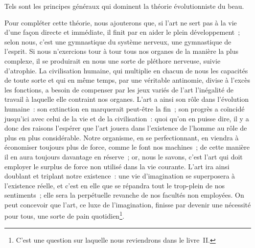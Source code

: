 \documentclass[french,twoside]{book} %
\begin{document}
Tels sont les principes généraux qui dominent la théorie évolutionniste du beau.\par
Pour compléter cette théorie, nous ajouterons que, si l’art ne sert pas à la vie d’une façon directe et immédiate, il finit par en aider le plein développement ; selon nous, c’est une gymnastique du système nerveux, une gymnastique de l’esprit. Si nous n’exercions tour à tour tous nos organes de la manière la plus complexe, il se produirait en nous une sorte de pléthore nerveuse, suivie d’atrophie. La civilisation humaine, qui multiplie en chacun de nous les capacités de toute sorte et qui en même temps, par une véritable antinomie, divise à l’excès les fonctions, a besoin de compenser par les jeux variés de  l’art l’inégalité de travail à laquelle elle contraint nos organes. L’art a ainsi son rôle dans l’évolution humaine : son extinction en marquerait peut-être la fin ; son progrès a coïncidé jusqu’ici avec celui de la vie et de la civilisation : quoi qu’on en puisse dire, il y a donc des raisons l’espérer que l’art jouera dans l’existence de l’homme au rôle de plus en plus considérable. Notre organisme, en se perfectionnant, en viendra à économiser toujours plus de force, comme le font nos machines ; de cette manière il en aura toujours davantage en réserve ; or, nous le savons, c’est l’art qui doit employer le surplus de force non utilisé dans la vie courante. L’art ira ainsi doublant et triplant notre existence : une vie d’imagination se superposera à l’existence réelle, et c’est en elle que se répandra tout le trop-plein de nos sentiments ; elle sera la perpétuelle revanche de nos facultés non employées. On peut concevoir que l’art, ce luxe de l’imagination, finisse par devenir une nécessité pour tous, une sorte de pain quotidien\footnote{C’est une question sur laquelle nous reviendrons dans le livre II.}.
\end{document}
